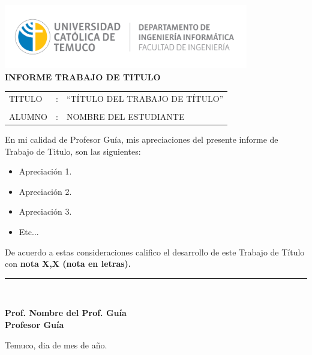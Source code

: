 \begin{center}
\vspace*{-9\baselineskip}
\hspace*{-0.1\textwidth}
\includegraphics[width=0.8\textwidth]{images/Logo_depto_ing_informatica.png}\nonumber\\
\textbf{INFORME  TRABAJO  DE TITULO}
\par\end{center}

\vspace{1cm}

\begin{tabular}{>{\raggedright}p{}>{\raggedright}p{}>{\raggedright}p{}}
TITULO & : & ``TÍTULO DEL TRABAJO DE TÍTULO''\tabularnewline
 &  & \tabularnewline
ALUMNO & : & NOMBRE DEL ESTUDIANTE\tabularnewline
\end{tabular}

\vspace{1cm}

En mi calidad de Profesor Guía, mis apreciaciones del presente informe de Trabajo de Titulo, son las siguientes:
\begin{itemize}
    \item Apreciación 1.
    \item Apreciación 2. 
    \item Apreciación 3.
    \item Etc...
\end{itemize}


De acuerdo a estas consideraciones califico el desarrollo de este Trabajo de Título con \textbf{nota X,X  (nota en letras).}

\vspace{1cm}

\begin{flushright}
\rule{65mm}{0.2mm}\\
\end{flushright} 
\vspace*{-0.1in}  
\hspace*{3.2in} \textbf{Prof. Nombre del Prof. Guía} \\  
\hspace*{3.5in} \textbf{Profesor Guía}

\vspace{1cm}

Temuco, dia de mes de año.


